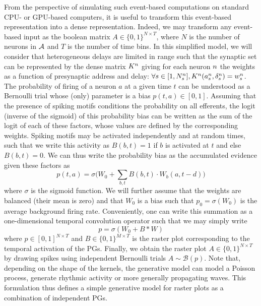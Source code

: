 \documentclass[default]{sn-jnl}%
\theoremstyle{thmstyleone}%
\theoremstyle{thmstyletwo}%
\theoremstyle{thmstylethree}%
\begin{document}
From the perspective of simulating such event-based computations on standard CPU- or GPU-based computers, it is useful to transform this event-based representation into a dense representation. Indeed, we may transform any event-based input as the boolean matrix $A \in \{0, 1 \}^{N\times T}$, where $N$ is the number of neurons in $\mathcal{A}$ and $T$ is the number of time bins. In this simplified model, we will consider that heterogeneous delays are limited in range such that the synaptic set can be represented by the dense matrix $K^n$ giving for each neuron $n$ the weights as a function of presynaptic address and delay: $\forall {s\in [1,N_{s}^n]}, K^n(a_s^n, \delta_s^n) = w_s^n$. 
The probability of firing of a neuron $a$ at a given time $t$ can be understood as a Bernoulli trial whose (only) parameter is a bias $p(t, a) \in [0, 1]$. Assuming that the presence of spiking motifs conditions the probability on all efferents, the logit (inverse of the sigmoid) of this probability bias can be written as the sum of the logit of each of these factors, whose values are defined by the corresponding weights. Spiking motifs may be activated independently and at random times, such that  we write this activity as $B(b, t)=1$ if $b$ is activated at $t$ and else $B(b, t)=0$. We can thus write the probability bias as the accumulated evidence given these factors as 
\begin{equation*}
p(t, a) = \sigma\big(W_0 + \sum_{b, t} B(b, t) \cdot W_b(a, t-d) \big)  
\end{equation*}
where $\sigma$ is the sigmoid function. We will further assume that the weights are balanced (their mean is zero) and that $W_0$ is a bias such that $p_0=\sigma(W_0)$ is the average background firing rate. Conveniently, one can write this summation as a one-dimensional temporal convolution operator such that we may simply write
\begin{equation*}
p = \sigma(W_0 + B \ast W )
\end{equation*}
where  $p\in [ 0, 1]^{N\times T}$ and $B\in \{0, 1\}^{M\times T}$ is the raster plot corresponding to the temporal activation of the PGs. Finally, we obtain the raster plot $A\in \{0, 1\}^{N\times T}$ by drawing spikes using independent Bernoulli trials $A \sim \mathcal{B}(p)$. Note that, depending on the shape of the kernels, the generative model can model a Poisson process, generate rhythmic activity or more generally propagating waves. This formulation thus defines a simple generative model for raster plots as a combination of independent PGs. 
\end{document}
